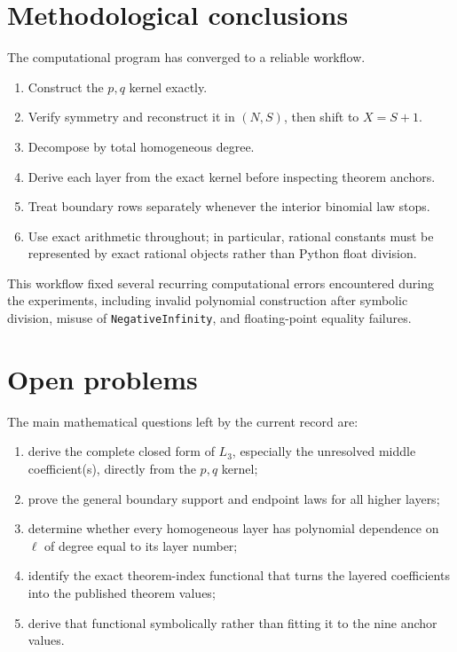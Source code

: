 \documentclass[11pt]{article}
\theoremstyle{remark}
\begin{document}
\section{Methodological conclusions}

The computational program has converged to a reliable workflow.

\begin{enumerate}[leftmargin=2em]
    \item Construct the \(p,q\) kernel exactly.
    \item Verify symmetry and reconstruct it in \((N,S)\), then shift to \(X=S+1\).
    \item Decompose by total homogeneous degree.
    \item Derive each layer from the exact kernel before inspecting theorem anchors.
    \item Treat boundary rows separately whenever the interior binomial law stops.
    \item Use exact arithmetic throughout; in particular, rational constants must be
          represented by exact rational objects rather than Python float division.
\end{enumerate}

This workflow fixed several recurring computational errors encountered during the
experiments, including invalid polynomial construction after symbolic division,
misuse of \texttt{NegativeInfinity}, and floating-point equality failures.

\section{Open problems}

The main mathematical questions left by the current record are:

\begin{enumerate}[leftmargin=2em]
    \item derive the complete closed form of \(L_3\), especially the unresolved
          middle coefficient(s), directly from the \(p,q\) kernel;
    \item prove the general boundary support and endpoint laws for all higher layers;
    \item determine whether every homogeneous layer has polynomial dependence on
          \(\ell\) of degree equal to its layer number;
    \item identify the exact theorem-index functional that turns the layered
          coefficients into the published theorem values;
    \item derive that functional symbolically rather than fitting it to the nine
          anchor values.
\end{enumerate}
\end{document}
